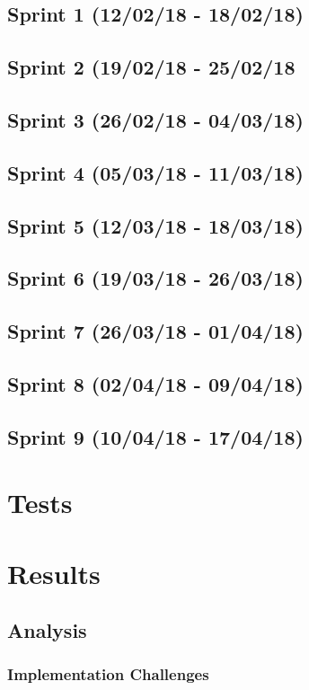 \documentclass[a4paper,10pt]{report}
\begin{document}
\section{Sprint 1 (12/02/18 - 18/02/18)}
\section{Sprint 2 (19/02/18 - 25/02/18}
\section{Sprint 3 (26/02/18 - 04/03/18)}
\section{Sprint 4 (05/03/18 - 11/03/18)}
\section{Sprint 5 (12/03/18 - 18/03/18)}
\section{Sprint 6 (19/03/18 - 26/03/18)}
\section{Sprint 7 (26/03/18 -  01/04/18)}
\section{Sprint 8 (02/04/18 -  09/04/18)}
\section{Sprint 9 (10/04/18 -  17/04/18)}

\chapter{Tests}

\chapter{Results}
\section{Analysis}
\subsection{Implementation Challenges}
\end{document}
